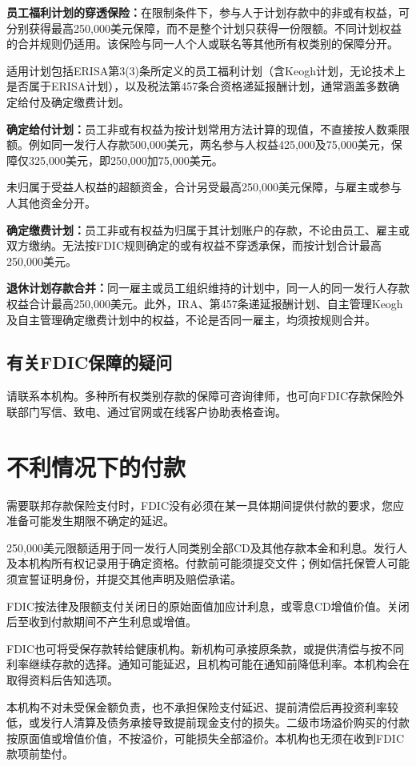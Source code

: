 \documentclass[UTF8,fontset=none,11pt,a4paper]{ctexart}
\begin{document}
\textbf{员工福利计划的穿透保险：}在限制条件下，参与人于计划存款中的非或有权益，可分别获得最高250,000美元保障，而不是整个计划只获得一份限额。不同计划权益的合并规则仍适用。该保险与同一人个人或联名等其他所有权类别的保障分开。


适用计划包括ERISA第3(3)条所定义的员工福利计划（含Keogh计划，无论技术上是否属于ERISA计划），以及税法第457条合资格递延报酬计划，通常涵盖多数确定给付及确定缴费计划。


\textbf{确定给付计划：}员工非或有权益为按计划常用方法计算的现值，不直接按人数乘限额。例如同一发行人存款500,000美元，两名参与人权益425,000及75,000美元，保障仅325,000美元，即250,000加75,000美元。


未归属于受益人权益的超额资金，合计另受最高250,000美元保障，与雇主或参与人其他资金分开。


\textbf{确定缴费计划：}员工非或有权益为归属于其计划账户的存款，不论由员工、雇主或双方缴纳。无法按FDIC规则确定的或有权益不穿透承保，而按计划合计最高250,000美元。


\textbf{退休计划存款合并：}同一雇主或员工组织维持的计划中，同一人的同一发行人存款权益合计最高250,000美元。此外，IRA、第457条递延报酬计划、自主管理Keogh及自主管理确定缴费计划中的权益，不论是否同一雇主，均须按规则合并。


\subsection*{有关FDIC保障的疑问}
请联系本机构。多种所有权类别存款的保障可咨询律师，也可向FDIC存款保险外联部门写信、致电、通过官网或在线客户协助表格查询。


\section*{不利情况下的付款}
需要联邦存款保险支付时，FDIC没有必须在某一具体期间提供付款的要求，您应准备可能发生期限不确定的延迟。


250,000美元限额适用于同一发行人同类别全部CD及其他存款本金和利息。发行人及本机构所有权记录用于确定资格。付款前可能须提交文件；例如信托保管人可能须宣誓证明身份，并提交其他声明及赔偿承诺。


FDIC按法律及限额支付关闭日的原始面值加应计利息，或零息CD增值价值。关闭后至收到付款期间不产生利息或增值。


FDIC也可将受保存款转给健康机构。新机构可承接原条款，或提供清偿与按不同利率继续存款的选择。通知可能延迟，且机构可能在通知前降低利率。本机构会在取得资料后告知选项。


本机构不对未受保金额负责，也不承担保险支付延迟、提前清偿后再投资利率较低，或发行人清算及债务承接导致提前现金支付的损失。二级市场溢价购买的付款按原面值或增值价值，不按溢价，可能损失全部溢价。本机构也无须在收到FDIC款项前垫付。
\end{document}
